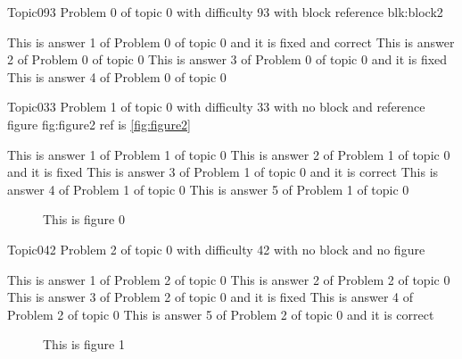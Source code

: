\documentclass[master]{exam}
\begin{document}
\begin{problem}[requires=blk:block2]{Topic0}{93}
	Problem 0 of topic 0 with difficulty 93 with block reference blk:block2
	\begin{answers}
		 This is answer 1 of Problem 0 of topic 0 and it is fixed and correct
		\answer This is answer 2 of Problem 0 of topic 0 
		\answer[fixed] This is answer 3 of Problem 0 of topic 0 and it is fixed
		\answer This is answer 4 of Problem 0 of topic 0 
	\end{answers}
\end{problem}

\begin{problem}{Topic0}{33}
	Problem 1 of topic 0 with difficulty 33 with no block and reference figure fig:figure2 ref is \ref{fig:figure2}
	\begin{answers}
		\answer This is answer 1 of Problem 1 of topic 0 
		\answer[fixed] This is answer 2 of Problem 1 of topic 0 and it is fixed
		\answer[correct] This is answer 3 of Problem 1 of topic 0 and it is correct
		\answer This is answer 4 of Problem 1 of topic 0 
		\answer This is answer 5 of Problem 1 of topic 0 
	\end{answers}
\end{problem}



\begin{figure}
	\begin{center}
		This is figure 0 
		\label{fig:figure0}
	\end{center}
\end{figure}

\begin{problem}{Topic0}{42}
	Problem 2 of topic 0 with difficulty 42 with no block and no figure
	\begin{answers}
		\answer This is answer 1 of Problem 2 of topic 0 
		\answer This is answer 2 of Problem 2 of topic 0 
		\answer[fixed] This is answer 3 of Problem 2 of topic 0 and it is fixed
		\answer This is answer 4 of Problem 2 of topic 0 
		\answer[correct] This is answer 5 of Problem 2 of topic 0 and it is correct
	\end{answers}
\end{problem}



\begin{figure}
	\begin{center}
		This is figure 1 
		\label{fig:figure1}
	\end{center}
\end{figure}
\end{document}
